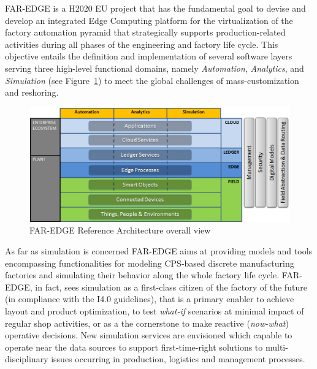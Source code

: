 
FAR-EDGE is a H2020 EU project that has the fundamental goal to devise and develop an integrated Edge Computing platform for the virtualization of the factory automation pyramid that strategically supports  production-related activities during all phases of the engineering and factory life cycle. 
This objective entails the definition and implementation of several software layers serving three high-level functional domains, namely \textit{Automation}, \textit{Analytics}, and \textit{Simulation} (see Figure~\ref{fig:architecture}) to meet the global challenges of mass-customization and reshoring.

\begin{figure}[b]
	\centering
	\includegraphics[width=\linewidth]{images/Far-edge.png}
	\caption{FAR-EDGE Reference Architecture overall view}
	\label{fig:architecture}
\end{figure}

As far as simulation is concerned FAR-EDGE aims at providing models and tools encompassing functionalities for modeling CPS-based discrete manufacturing factories and simulating their behavior along the whole factory life cycle. 
FAR-EDGE, in fact, sees simulation as a first-class citizen of the factory of the future (in compliance with the I4.0 guidelines), that is a primary enabler to achieve layout and product optimization, to test \textit{what-if} scenarios at minimal impact of regular shop activities, or as a the cornerstone to make reactive (\textit{now-what}) operative decisions. New simulation services are envisioned which capable to operate near the data sources to support first-time-right solutions to multi-disciplinary issues occurring in production, logistics and management processes.

